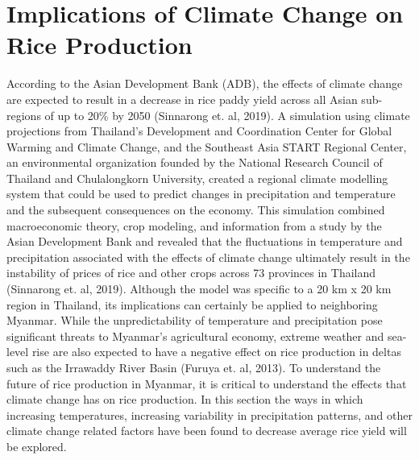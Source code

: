 \documentclass{book}\usepackage{knitr}
\begin{document}
\section{Implications of Climate Change on Rice Production}
According to the Asian Development Bank (ADB), the effects of climate change are expected to result in a decrease in rice paddy yield across all Asian sub-regions of up to 20\% by 2050 (Sinnarong et. al, 2019). A simulation using climate projections from Thailand’s Development and Coordination Center for Global Warming and Climate Change, and the Southeast Asia START Regional Center, an environmental organization founded by the National Research Council of Thailand and Chulalongkorn University, created a regional climate modelling system that could be used to predict changes in precipitation and temperature and the subsequent consequences on the economy. This simulation combined macroeconomic theory, crop modeling, and information from a study by the Asian Development Bank and revealed that the fluctuations in temperature and precipitation associated with the effects of climate change ultimately result in the instability of prices of rice and other crops across 73 provinces in Thailand (Sinnarong et. al, 2019). Although the model was specific to a 20 km x 20 km region in Thailand, its implications can certainly be applied to neighboring Myanmar. While the unpredictability of temperature and precipitation pose significant threats to Myanmar’s agricultural economy, extreme weather and sea-level rise are also expected to have a negative effect on rice production in deltas such as the Irrawaddy River Basin (Furuya et. al, 2013). To understand the future of rice production in Myanmar, it is critical to understand the effects that climate change has on rice production. In this section the ways in which increasing temperatures, increasing variability in precipitation patterns, and other climate change related factors have been found to decrease average rice yield will be explored.
\end{document}
